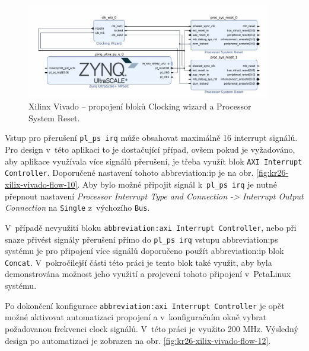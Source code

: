 \documentclass[a4paper, twoside, 11pt]{article}
\begin{document}
				\begin{figure}[htbp!]
					\centering
					\includegraphics[width=0.95\textwidth]{src/png/kr26-xilinx-vivado-flow/kr26-xilix-vivado-flow-09.jpg}
					\caption{Xilinx Vivado – propojení bloků Clocking wizard a Processor System Reset.}
					\label{fig:kr26-xilix-vivado-flow-09}
				\end{figure}
				
				Vstup pro přerušení \texttt{pl\_ps irq} může obsahovat maximálně 16 interrupt signálů. Pro design v~této aplikaci to je dostačující případ, ovšem pokud je vyžadováno, aby aplikace využívala více signálů přerušení, je třeba využít blok \texttt{AXI Interrupt Controller}. Doporučené nastavení tohoto \gls{abbreviation:ip} je na obr. \ref{fig:kr26-xilix-vivado-flow-10}. Aby bylo možné připojit signál k~\texttt{pl\_ps irq} je nutné přepnout nastavení \textit{Processor Interrupt Type and Connection -> Interrupt Output Connection} na \texttt{Single} z~výchozího \texttt{Bus}.\par
				V~případě nevyužití bloku \texttt{\gls{abbreviation:axi} Interrupt Controller}, nebo při snaze přivést signály přerušení přímo do \texttt{pl\_ps irq} vstupu \gls{abbreviation:ps} systému je pro připojení více signálů doporučeno použít \gls{abbreviation:ip} blok \texttt{Concat}. V~pokročilejší části této práci je tento blok také využit, aby byla demonstrována možnost jeho využití a projevení tohoto připojení v~PetaLinux systému.\par
				Po dokončení konfigurace \texttt{\gls{abbreviation:axi} Interrupt Controller} je opět možné aktivovat automatizaci propojení a v~konfiguračním okně vybrat požadovanou frekvenci clock signálů. V~této práci je využito 200 MHz. Výsledný design po automatizaci je zobrazen na obr. \ref{fig:kr26-xilix-vivado-flow-12}.\par
\end{document}
